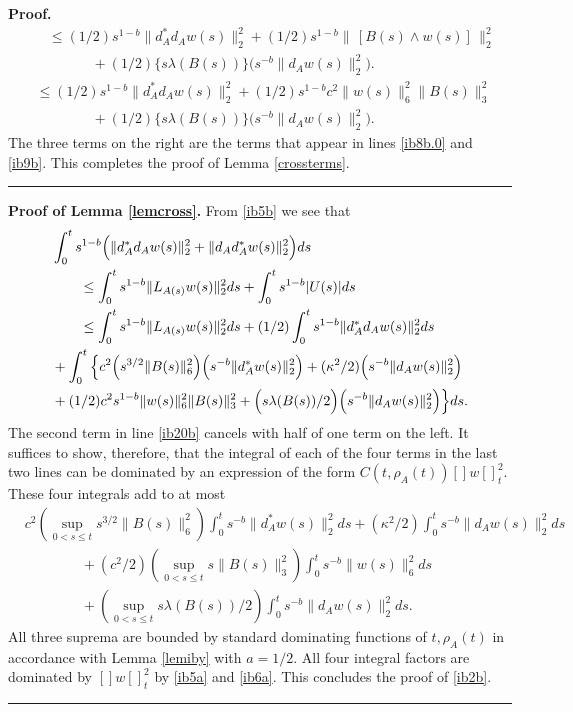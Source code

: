 \documentclass[12pt]{article}
\newenvironment{proof}[1][Proof]{\textbf{#1.} }{\ \rule{0.5em}{0.5em}}
\def \nn{[]}
\def \eref{\eqref}
\numberwithin{equation}{section}
\begin{document}
\begin{proof}
\begin{align*}
  &\ \ \ \ \le    (1/2) s^{1-b} \| d_A^* d_A w(s)\|_2^2   
  +(1/2)s^{1-b}\|\,[B(s)\wedge w(s)]\,\|_2^2   \\
  &\qquad\qquad      +(1/2) \Big\{s\lambda(B(s))\Big\}\Big(s^{-b} \| d_A w(s) \|_2^2\Big).\\
  &\le  (1/2) s^{1-b} \| d_A^* d_A w(s)\|_2^2   
  +(1/2)s^{1-b}c^2 \|w(s)\|_6^2 \| B(s)\|_3^2   \\
  &\qquad\qquad      +(1/2) \Big\{s\lambda(B(s))\Big\}\Big(s^{-b} \| d_A w(s) \|_2^2\Big).
\end{align*}
The three terms on the right are the terms that appear in lines \eref{ib8b.0} and \eref{ib9b}.
This completes the proof of Lemma \ref{crossterms}.
\end{proof}

\bigskip
\noindent
\begin{proof}[Proof of Lemma \ref{lemcross}]
From \eref{ib5b} we see that
\begin{align}
&\int_0^t s^{1-b}\Big(\|d_A^*d_A w(s)\|_2^2  + \| d_A d_A^* w(s)\|_2^2\Big) ds  \notag\\
&\ \ \ \ \ \ \le   \int_0^t s^{1-b}\| L_{A(s)} w(s)\|_2^2 ds   +\int_0^t s^{1-b}|U(s)|ds              \notag\\ 
&\ \ \ \ \ \ \le  \int_0^t s^{1-b}\| L_{A(s)} w(s)\|_2^2 ds 
+ (1/2)\int_0^t s^{1-b} \|d_A^*d_A w(s)\|_2^2ds            \label{ib20b} \\
&+\int_0^t \Big\{c^2 \Big(s^{3/2} \| B(s)\|_6^2 \Big) \Big( s^{-b} \| d_A^* w(s) \|_2^2 \Big) 
           +(\kappa^2/2) \Big( s^{-b} \| d_A w(s)\|_2^2\Big)                                          \notag\\
            &+ (1/2)c^2 s^{1-b}\|w(s)\|_6^2 \| B(s)\|_3^2
               + \Big(s\lambda(B(s))/2\Big)\Big(s^{-b} \| d_A w(s) \|_2^2\Big)   \Big\}ds.   \label{ib21b}
\end{align}
The second term in line \eref{ib20b} cancels with half of one term on the left.  It suffices
to show,  therefore, that the integral of each of the four terms in the last two lines
can be dominated by an expression of the form $C(t,\rho_A(t)) \nn w\nn_t^2$.
 These four integrals  add to at most
\begin{align*}
&   c^2 (\sup_{0< s \le t}s^{3/2} \|B(s)\|_6^2)\int_0^t s^{-b} \| d_A^* w(s) \|_2^2ds +
(\kappa^2/2)\int_0^t s^{-b} \| d_A w(s)\|_2^2ds \\
& \qquad\qquad + (c^2/2)(\sup_{0< s \le t}s\|B(s)\|_3^2) \int_0^t s^{-b} \|w(s)\|_6^2 ds  \\
&\qquad\qquad + (\sup_{0 <s \le t} s\lambda(B(s))/2)\int_0^t s^{-b} \| d_A w(s) \|_2^2 ds.
\end{align*}
All three suprema are bounded by standard dominating functions of $t, \rho_A(t)$ in accordance
with Lemma \ref{lemiby} with $a = 1/2$. All four integral  factors  are dominated by $\nn w \nn_t^2$
by \eref{ib5a} and \eref{ib6a}. 
This concludes the proof of \eref{ib2b}.
\end{proof}
\end{document}
